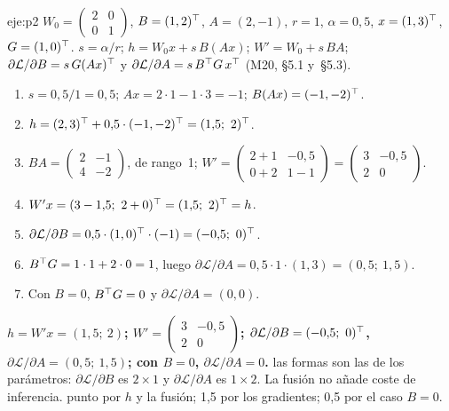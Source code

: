 \begin{solucion}{eje:p2}
\datos $W_0=\begin{pmatrix}2&0\\0&1\end{pmatrix}$, $B=(1,2)^{\top}$, $A=(2,-1)$, $r=1$, $\alpha=0{,}5$, $x=(1,3)^{\top}$, $G=(1,0)^{\top}$.
\planteamiento $s=\alpha/r$; $h=W_0x+s\,B(Ax)$; $W'=W_0+s\,BA$; $\partial\mathcal{L}/\partial B=s\,G(Ax)^{\top}$ y $\partial\mathcal{L}/\partial A=s\,B^{\top} G\,x^{\top}$ (M20, §5.1 y~§5.3).
\pasos
\begin{enumerate}[label=\arabic*.]
  \item $s=0{,}5/1=0{,}5$; $Ax=2\cdot 1-1\cdot 3=-1$; $B(Ax)=(-1,-2)^{\top}$.
  \item $h=(2,3)\T+0{,}5\cdot(-1,-2)\T=(1{,}5;\ 2)\T$.
  \item $BA=\begin{pmatrix}2&-1\\4&-2\end{pmatrix}$, de rango~1; $W'=\begin{pmatrix}2+1&-0{,}5\\0+2&1-1\end{pmatrix}=\begin{pmatrix}3&-0{,}5\\2&0\end{pmatrix}$.
  \item $W'x=(3-1{,}5;\ 2+0)\T=(1{,}5;\ 2)\T=h$.
  \item $\partial\mathcal{L}/\partial B=0{,}5\cdot(1,0)^{\top}\cdot(-1)=(-0{,}5;\ 0)^{\top}$.
  \item $B^{\top} G=1\cdot 1+2\cdot 0=1$, luego $\partial\mathcal{L}/\partial A=0{,}5\cdot 1\cdot(1,3)=(0{,}5;\ 1{,}5)$.
  \item Con $B=0$, $B^{\top} G=0$ y $\partial\mathcal{L}/\partial A=(0,0)$.
\end{enumerate}
\resultado \textbf{$h=W'x=(1{,}5;\ 2)$; $W'=\begin{pmatrix}3&-0{,}5\\2&0\end{pmatrix}$; $\partial\mathcal{L}/\partial B=(-0{,}5;\ 0)\T$, $\partial\mathcal{L}/\partial A=(0{,}5;\ 1{,}5)$; con $B=0$, $\partial\mathcal{L}/\partial A=0$.}
\comprobacion las formas son las de los parámetros: $\partial\mathcal{L}/\partial B$ es $2\times 1$ y $\partial\mathcal{L}/\partial A$ es $1\times 2$. La fusión no añade coste de inferencia.
 punto por $h$ y la fusión; 1,5 por los gradientes; 0,5 por el caso $B=0$.


\end{solucion}
